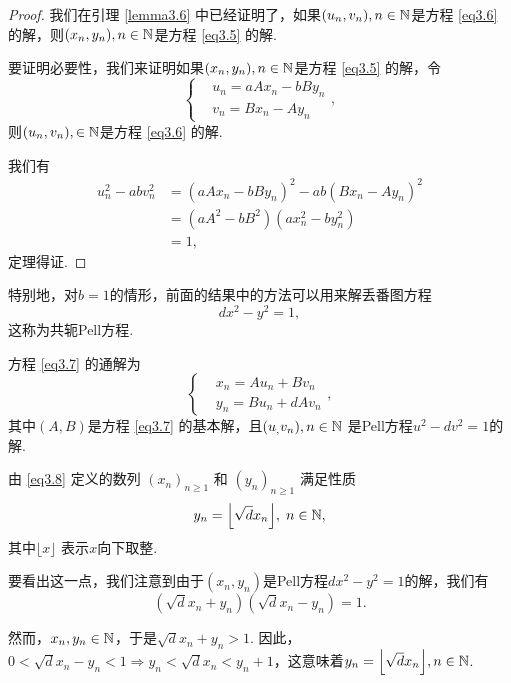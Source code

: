 \begin{proof}
  我们在引理 \ref{lemma3.6} 中已经证明了，如果$(u_n,v_n),n\in\mathbb N$是方程 \eqref{eq3.6} 的解，则$(x_n,y_n),n\in\mathbb N$是方程 \eqref{eq3.5} 的解.

  要证明必要性，我们来证明如果$(x_n,y_n),n\in\mathbb N$是方程 \eqref{eq3.5} 的解，令
  \[
    \left\{
      \begin{aligned}
        & u_n = aAx_n - bBy_n \\
        & v_n = Bx_n - Ay_n
      \end{aligned}
    \right.,
  \]
  则$(u_n,v_n),\in\mathbb N$是方程 \eqref{eq3.6} 的解.

  我们有
  \begin{align*}
    u_n^2 - abv_n^2 & = (aAx_n - bBy_n)^2 - ab(Bx_n - Ay_n)^2 \\
    & = (aA^2 - bB^2) (ax_n^2 - by_n^2) \\
    & = 1,
  \end{align*}
  定理得证.
\end{proof}

特别地，对$b=1$的情形，前面的结果中的方法可以用来解丢番图方程
\begin{equation}\label{eq3.7}
  dx^2 - y^2 =1,
\end{equation}
这称为{\kaishu 共轭Pell方程}.

方程 \eqref{eq3.7} 的通解为
\begin{equation}\label{eq3.8}
  \left\{
    \begin{aligned}
      & x_n = Au_n + Bv_n \\
      & y_n = Bu_n + dAv_n
    \end{aligned}
  \right.,
\end{equation}
其中$(A,B)$是方程 \eqref{eq3.7} 的基本解，且$(u_,v_n),n\in\mathbb N$
是Pell方程$u^2-dv^2=1$的解.

\begin{remark}
  由 \eqref{eq3.8} 定义的数列 $(x_n)_{n\ge1}$ 和
  $(y_n)_{n\ge1}$ 满足性质
  \[
    y_n = \left\lfloor \sqrt d x_n \right\rfloor,\; n\in\MN,
  \]
  其中$\lfloor x\rfloor$ 表示$x$向下取整.
\end{remark}

要看出这一点，我们注意到由于$(x_n,y_n)$是Pell方程$dx^2-y^2=1$的解，我们有
\[
  ( \sqrt dx_n + y_n ) (\sqrt d x_n - y_n ) = 1.
\]

然而，$x_n,y_n\in\mathbb N$，于是$\sqrt dx_n+y_n>1$. 因此，$0<\sqrt dx_n-y_n<1\Rightarrow y_n<\sqrt dx_n<y_n+1$，这意味着$y_n=\left\lfloor \sqrt dx_n\right\rfloor,n\in\MN$.

